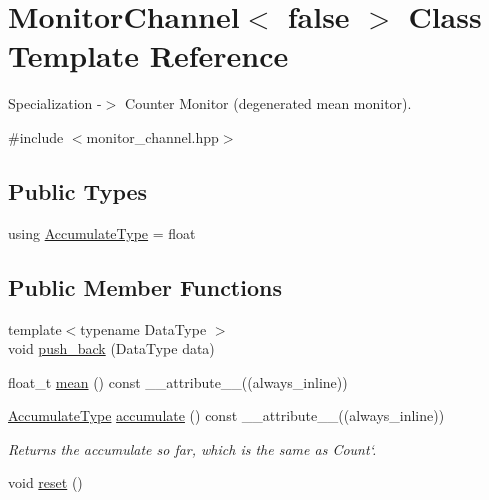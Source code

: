 \hypertarget{classMonitorChannel_3_01false_01_4}{}\section{Monitor\+Channel$<$ false $>$ Class Template Reference}
\label{classMonitorChannel_3_01false_01_4}


Specialization -\/$>$ Counter Monitor (degenerated mean monitor).  




{\ttfamily \#include $<$monitor\+\_\+channel.\+hpp$>$}

\subsection*{Public Types}
\begin{DoxyCompactItemize}
\item 
using \hyperlink{classMonitorChannel_3_01false_01_4_ac36f4071aff4c11fda63ff839d13345c}{Accumulate\+Type} = float
\end{DoxyCompactItemize}
\subsection*{Public Member Functions}
\begin{DoxyCompactItemize}
\item 
{\footnotesize template$<$typename Data\+Type $>$ }\\void \hyperlink{classMonitorChannel_3_01false_01_4_ac074706af7eebfb6478ffeedb87537ba}{push\+\_\+back} (Data\+Type data)
\item 
float\+\_\+t \hyperlink{classMonitorChannel_3_01false_01_4_aff1c900b36c53bd674b53f94c3c2770b}{mean} () const \+\_\+\+\_\+attribute\+\_\+\+\_\+((always\+\_\+inline))
\item 
\hyperlink{classMonitorChannel_3_01false_01_4_ac36f4071aff4c11fda63ff839d13345c}{Accumulate\+Type} \hyperlink{classMonitorChannel_3_01false_01_4_a55677fe669bca6b9382fc3baa73162b9}{accumulate} () const \+\_\+\+\_\+attribute\+\_\+\+\_\+((always\+\_\+inline))
\begin{DoxyCompactList}\small\item\em Returns the accumulate so far, which is the same as \textquotesingle{}Count`. \end{DoxyCompactList}\item 
void \hyperlink{classMonitorChannel_3_01false_01_4_a9310343e280b593894ac370932be4cbe}{reset} ()
\end{DoxyCompactItemize}
